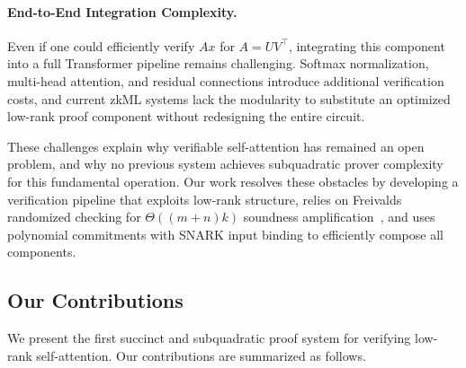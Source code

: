 \documentclass[11pt]{article}
\begin{document}
\paragraph{End-to-End Integration Complexity.}
Even if one could efficiently verify $A x$ for $A = U V^\top$, integrating 
this component into a full Transformer pipeline remains challenging.  
Softmax normalization, multi-head attention, and residual connections 
introduce additional verification costs, and current zkML systems lack 
the modularity to substitute an optimized low-rank proof component 
without redesigning the entire circuit.

These challenges explain why verifiable self-attention has remained an 
open problem, and why no previous system achieves subquadratic prover 
complexity for this fundamental operation.
Our work resolves these obstacles by developing a verification pipeline 
that exploits low-rank structure, relies on Freivalds randomized checking 
for $\Theta((m+n)k)$ soundness amplification~\cite{freivalds1979fast}, and 
uses polynomial commitments with SNARK input binding to efficiently 
compose all components.


\subsection{Our Contributions}

We present the first succinct and subquadratic proof system for
verifying low-rank self-attention.  
Our contributions are summarized as follows.
\end{document}
